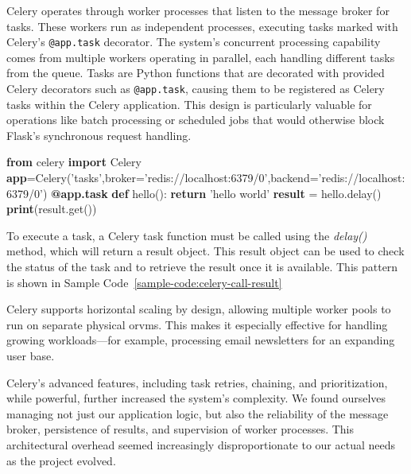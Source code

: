         Celery operates through worker processes that listen to the message broker for tasks. These workers run as 
        independent processes, executing tasks marked with Celery's \texttt{@app.task} decorator. The system's concurrent processing 
        capability comes from multiple workers operating in parallel, each handling different tasks from the queue. Tasks are Python 
        functions that are decorated with provided Celery decorators such as \texttt{@app.task}, causing them to be registered as 
        Celery tasks within the Celery application. This design is particularly valuable for operations like batch processing or 
        scheduled jobs that would otherwise block Flask's synchronous request handling.

        \begin{algorithm}
            \begin{algorithmic}[1]
            \State \textbf{from} celery \textbf{import} Celery
            \State
            \State \textbf{app}=Celery('tasks',broker='redis://localhost:6379/0',backend='redis://localhost:6379/0')
            \State
            \State \textbf{@app.task}
            \State \textbf{def} hello():
            \State \hspace{1em} \textbf{return} 'hello world'
            \State
            \State \textbf{result} = hello.delay()
            \State \textbf{print}(result.get())
            \end{algorithmic}
            \caption{Calling a Celery Task and Getting the Result}\label{sample-code:celery-call-result}
        \end{algorithm}

        To execute a task, a Celery task function must be called using the \textit{delay()} method, which will return a result object. 
        This result object can be used to check the status of the task and to retrieve the result once it is available. This pattern is 
        shown in Sample Code~\ref{sample-code:celery-call-result}

        Celery supports horizontal scaling by design, allowing multiple worker pools to run on separate physical or\ac{vm}s. 
        This makes it especially effective for handling growing workloads—for example, processing email newsletters for an expanding 
        user base.

        Celery's advanced features, including task retries, chaining, and prioritization, while powerful, further increased the 
        system's complexity. We found ourselves managing not just our application logic, but also the reliability of the message broker, 
        persistence of results, and supervision of worker processes. This architectural overhead seemed increasingly disproportionate to 
        our actual needs as the project evolved.

